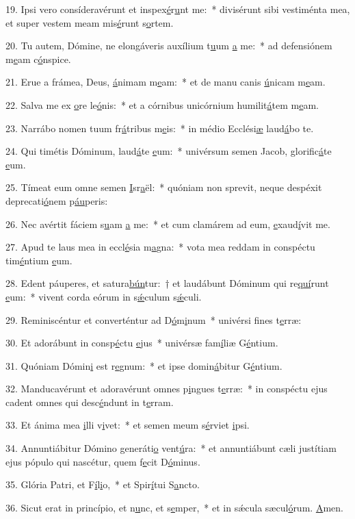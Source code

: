 19. Ipsi vero consíderavérunt et inspex\uline{é}r\uline{u}nt me:~* divisérunt sibi vestiménta mea, et super vestem meam mis\uline{é}runt s\uline{o}rtem.\par 
20. Tu autem, Dómine, ne elongáveris auxílium t\uline{u}um \uline{a} me:~* ad defensiónem m\uline{e}am c\uline{ó}nspice.\par 
21. Erue a frámea, Deus, \uline{á}nimam m\uline{e}am:~* et de manu canis \uline{ú}nicam m\uline{e}am.\par 
22. Salva me ex \uline{o}re le\uline{ó}nis:~* et a córnibus unicórnium humilit\uline{á}tem m\uline{e}am.\par 
23. Narrábo nomen tuum fr\uline{á}tribus m\uline{e}is:~* in médio Ecclési\uline{æ} laud\uline{á}bo te.\par 
24. Qui timétis Dóminum, laud\uline{á}te \uline{e}um:~* univérsum semen Jacob, glorific\uline{á}te \uline{e}um.\par 
25. Tímeat eum omne semen \uline{I}sr\uline{a}ël:~* quóniam non sprevit, neque despéxit deprecati\uline{ó}nem p\uline{áu}peris:\par 
26. Nec avértit fáciem s\uline{u}am \uline{a} me:~* et cum clamárem ad eum, \uline{e}xaud\uline{í}vit me.\par 
27. Apud te laus mea in eccl\uline{é}sia m\uline{a}gna:~* vota mea reddam in conspéctu tim\uline{é}ntium \uline{e}um.\par 
28. Edent páuperes, et satura\uline{bún}tur:~† et laudábunt Dóminum qui re\uline{quí}runt \uline{e}um:~* vivent corda eórum in s\uline{ǽ}culum s\uline{ǽ}culi.\par 
29. Reminiscéntur et converténtur ad D\uline{ó}m\uline{i}num~* univérsi f\uline{i}nes t\uline{e}rræ:\par 
30. Et adorábunt in consp\uline{é}ctu \uline{e}jus~* univérsæ fam\uline{í}liæ G\uline{é}ntium.\par 
31. Quóniam Dómin\uline{i} est r\uline{e}gnum:~* et ipse domin\uline{á}bitur G\uline{é}ntium.\par 
32. Manducavérunt et adoravérunt omnes p\uline{i}ngues t\uline{e}rræ:~* in conspéctu ejus cadent omnes qui desc\uline{é}ndunt in t\uline{e}rram.\par 
33. Et ánima mea \uline{i}lli v\uline{i}vet:~* et semen meum s\uline{é}rviet \uline{i}psi.\par 
34. Annuntiábitur Dómino generáti\uline{o} vent\uline{ú}ra:~* et annuntiábunt cæli justítiam ejus pópulo qui nascétur, quem f\uline{e}cit D\uline{ó}minus.\par 
35. Glória Patri, et F\uline{í}l\uline{i}o,~* et Spir\uline{í}tui S\uline{a}ncto.\par 
36. Sicut erat in princípio, et n\uline{u}nc, et s\uline{e}mper,~* et in sǽcula sæcul\uline{ó}rum. \uline{A}men.\par 
